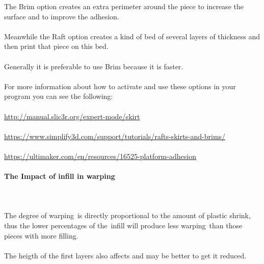 \documentclass[11pt,a4paper]{article}
\begin{document}
The Brim option creates an extra perimeter around the piece to increase the surface and to improve the adhesion.
\\\\
Meanwhile the Raft option creates a kind of bed of several layers of thickness and then print that piece on this bed.
\\\\
Generally it is preferable to use Brim because it is faster.
\\\\
For more information about how to activate and use these options in your program you can see the following:\\\\
\url{http://manual.slic3r.org/expert-mode/skirt}\\\\
\url{https://www.simplify3d.com/support/tutorials/rafts-skirts-and-brims/}\\\\
\url{https://ultimaker.com/en/resources/16525-platform-adhesion}
			\paragraph{The Impact of infill in warping}\mbox{}\\\\
The degree of warping is directly proportional to the amount of plastic shrink, thus the lower percentages of the infill will produce less warping than those pieces with more filling.
\\\\
The heigth of the first layers also affects and may be better to get it reduced.
\end{document}

